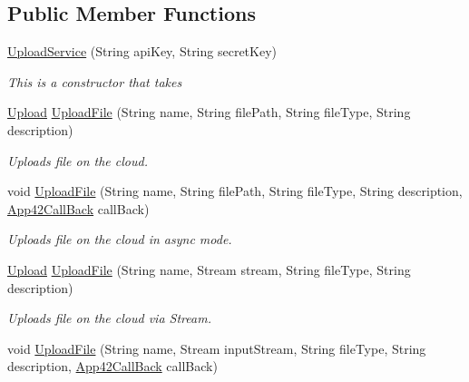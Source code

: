 \subsection*{Public Member Functions}
\begin{DoxyCompactItemize}
\item 
\hyperlink{classcom_1_1shephertz_1_1app42_1_1paas_1_1sdk_1_1csharp_1_1upload_1_1_upload_service_af1488abc384964cf9fa1d7dd2aff2f4e}{Upload\+Service} (String api\+Key, String secret\+Key)
\begin{DoxyCompactList}\small\item\em This is a constructor that takes \end{DoxyCompactList}\item 
\hyperlink{classcom_1_1shephertz_1_1app42_1_1paas_1_1sdk_1_1csharp_1_1upload_1_1_upload}{Upload} \hyperlink{classcom_1_1shephertz_1_1app42_1_1paas_1_1sdk_1_1csharp_1_1upload_1_1_upload_service_a181efe4b5b471fd2d69ffd3eacfac737}{Upload\+File} (String name, String file\+Path, String file\+Type, String description)
\begin{DoxyCompactList}\small\item\em Uploads file on the cloud. \end{DoxyCompactList}\item 
void \hyperlink{classcom_1_1shephertz_1_1app42_1_1paas_1_1sdk_1_1csharp_1_1upload_1_1_upload_service_a5d86655c3aa90f20ff47ac0b03b2296d}{Upload\+File} (String name, String file\+Path, String file\+Type, String description, \hyperlink{interfacecom_1_1shephertz_1_1app42_1_1paas_1_1sdk_1_1csharp_1_1_app42_call_back}{App42\+Call\+Back} call\+Back)
\begin{DoxyCompactList}\small\item\em Uploads file on the cloud in async mode. \end{DoxyCompactList}\item 
\hyperlink{classcom_1_1shephertz_1_1app42_1_1paas_1_1sdk_1_1csharp_1_1upload_1_1_upload}{Upload} \hyperlink{classcom_1_1shephertz_1_1app42_1_1paas_1_1sdk_1_1csharp_1_1upload_1_1_upload_service_a9e6327d9e1ce1f81110cdcafd680ee95}{Upload\+File} (String name, Stream stream, String file\+Type, String description)
\begin{DoxyCompactList}\small\item\em Uploads file on the cloud via Stream. \end{DoxyCompactList}\item 
void \hyperlink{classcom_1_1shephertz_1_1app42_1_1paas_1_1sdk_1_1csharp_1_1upload_1_1_upload_service_a0b8256ed876a919105c5e20ab3299c94}{Upload\+File} (String name, Stream input\+Stream, String file\+Type, String description, \hyperlink{interfacecom_1_1shephertz_1_1app42_1_1paas_1_1sdk_1_1csharp_1_1_app42_call_back}{App42\+Call\+Back} call\+Back)

\end{DoxyCompactItemize}
